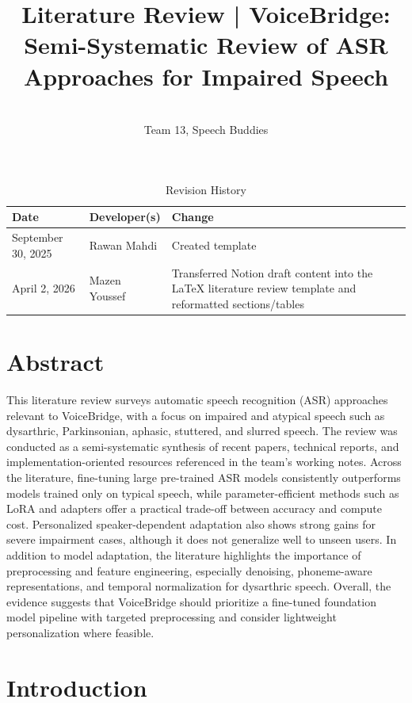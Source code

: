 \documentclass{article}
\title{Literature Review | VoiceBridge: \textbf{Semi-Systematic Review of ASR Approaches for Impaired Speech}}
\author{\\ Team 13, Speech Buddies}
\date{}
\begin{document}
\maketitle

\begin{table}[h]
\caption{Revision History}
\label{TblRevisionHistory}
\begin{tabularx}{\textwidth}{llX}
\toprule
\textbf{Date} & \textbf{Developer(s)} & \textbf{Change}\\
\midrule
September 30, 2025 & Rawan Mahdi & Created template\\
April 2, 2026 & Mazen Youssef & Transferred Notion draft content into the LaTeX literature review template and reformatted sections/tables\\
\bottomrule
\end{tabularx}
\end{table}

\newpage

\section*{Abstract}

This literature review surveys automatic speech recognition (ASR) approaches relevant to VoiceBridge, with a focus on impaired and atypical speech such as dysarthric, Parkinsonian, aphasic, stuttered, and slurred speech. The review was conducted as a semi-systematic synthesis of recent papers, technical reports, and implementation-oriented resources referenced in the team's working notes. Across the literature, fine-tuning large pre-trained ASR models consistently outperforms models trained only on typical speech, while parameter-efficient methods such as LoRA and adapters offer a practical trade-off between accuracy and compute cost. Personalized speaker-dependent adaptation also shows strong gains for severe impairment cases, although it does not generalize well to unseen users. In addition to model adaptation, the literature highlights the importance of preprocessing and feature engineering, especially denoising, phoneme-aware representations, and temporal normalization for dysarthric speech. Overall, the evidence suggests that VoiceBridge should prioritize a fine-tuned foundation model pipeline with targeted preprocessing and consider lightweight personalization where feasible.

\section{Introduction}
\end{document}
